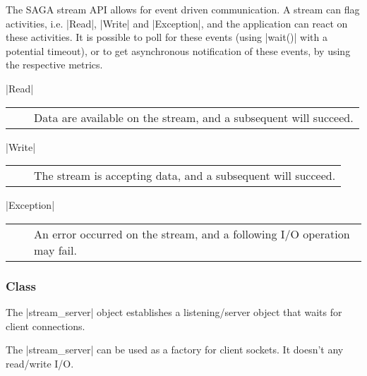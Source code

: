    The SAGA stream API allows for event driven communication.  A
   stream can flag activities, i.e. |Read|, |Write| and
   |Exception|, and the application can react on these
   activities.  It is possible to poll for these events (using
   |wait()| with a potential timeout), or to get asynchronous
   notification of these events, by using the respective
   metrics.
 
   |Read|\\[1.5mm]
   \begin{tabular}{cp{110mm}}
     ~~ & Data are available on the stream, and a subsequent
          \T{read()} will succeed.
   \end{tabular}
 
   |Write|\\[1.5mm]
   \begin{tabular}{cp{110mm}}
     ~~ & The stream is accepting data, and a subsequent 
          \T{write()} will succeed.
   \end{tabular}
 
   |Exception|\\[1.5mm]
   \begin{tabular}{cp{110mm}}
     ~~ & An error occurred on the stream, and a following I/O
          operation may fail.
   \end{tabular}
 
 
  \subsubsection*{Class }
 
    The |stream_server| object  establishes a listening/server object
    that waits for client connections.  
    
    The |stream_server| can   be used as a
    factory for client sockets.  It doesn't 
    any read/write I/O.  
    
